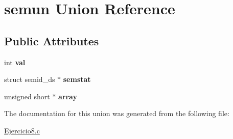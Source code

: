 \hypertarget{unionsemun}{}\section{semun Union Reference}
\label{unionsemun}
\subsection*{Public Attributes}
\begin{DoxyCompactItemize}
\item 
int {\bfseries val}\hypertarget{unionsemun_ac6121ecb6d04a024e07e12bd71b94031}{}\label{unionsemun_ac6121ecb6d04a024e07e12bd71b94031}

\item 
struct semid\+\_\+ds $\ast$ {\bfseries semstat}\hypertarget{unionsemun_afb976847aea44952be2118ad0329d832}{}\label{unionsemun_afb976847aea44952be2118ad0329d832}

\item 
unsigned short $\ast$ {\bfseries array}\hypertarget{unionsemun_aca23b8e730a0553205813c0cb7692b54}{}\label{unionsemun_aca23b8e730a0553205813c0cb7692b54}

\end{DoxyCompactItemize}


The documentation for this union was generated from the following file\+:\begin{DoxyCompactItemize}
\item 
\hyperlink{Ejercicio8_8c}{Ejercicio8.\+c}\end{DoxyCompactItemize}
